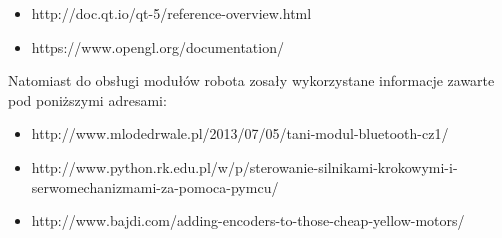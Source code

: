 \documentclass[a4paper]{article}
\begin{document}
\begin{itemize}
\item http://doc.qt.io/qt-5/reference-overview.html
\item https://www.opengl.org/documentation/
\end{itemize}

Natomiast do obsługi modułów robota zosały wykorzystane informacje zawarte pod poniższymi adresami:

\begin{itemize}
\item http://www.mlodedrwale.pl/2013/07/05/tani-modul-bluetooth-cz1/
\item http://www.python.rk.edu.pl/w/p/sterowanie-silnikami-krokowymi-i-serwomechanizmami-za-pomoca-pymcu/
\item http://www.bajdi.com/adding-encoders-to-those-cheap-yellow-motors/
\end{itemize}
\end{document}
